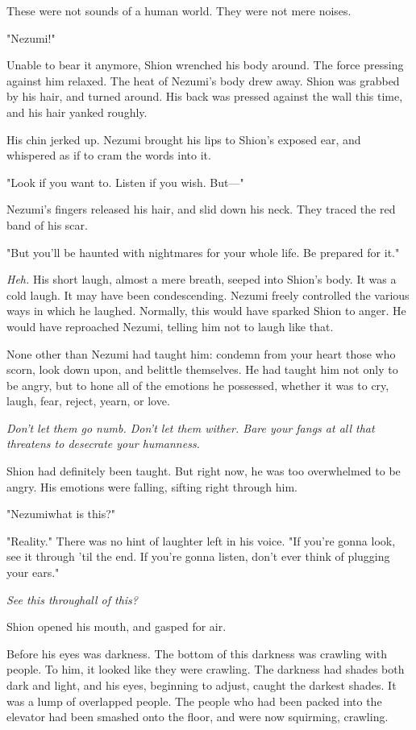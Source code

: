 These were not sounds of a human world. They were not mere noises.

"Nezumi!"

Unable to bear it anymore, Shion wrenched his body around. The force
pressing against him relaxed. The heat of Nezumi's body drew away. Shion
was grabbed by his hair, and turned around. His back was pressed against
the wall this time, and his hair yanked roughly.

His chin jerked up. Nezumi brought his lips to Shion's exposed ear, and
whispered as if to cram the words into it.

"Look if you want to. Listen if you wish. But---"

Nezumi's fingers released his hair, and slid down his neck. They traced
the red band of his scar.

"But you'll be haunted with nightmares for your whole life. Be prepared
for it."

\emph{Heh.} His short laugh, almost a mere breath, seeped into Shion's body. It
was a cold laugh. It may have been condescending. Nezumi freely
controlled the various ways in which he laughed. Normally, this would
have sparked Shion to anger. He would have reproached Nezumi, telling
him not to laugh like that.

None other than Nezumi had taught him: condemn from your heart those who
scorn, look down upon, and belittle themselves. He had taught him not
only to be angry, but to hone all of the emotions he possessed, whether
it was to cry, laugh, fear, reject, yearn, or love.

\emph{Don't let them go numb. Don't let them wither. Bare your fangs at all
that threatens to desecrate your humanness.}

Shion had definitely been taught. But right now, he was too overwhelmed
to be angry. His emotions were falling, sifting right through him.

"Nezumi\el what is this?"

"Reality." There was no hint of laughter left in his voice. "If you're
gonna look, see it through 'til the end. If you're gonna listen, don't
ever think of plugging your ears."

\emph{See this through\el all of this?}

Shion opened his mouth, and gasped for air.

Before his eyes was darkness. The bottom of this darkness was crawling
with people. To him, it looked like they were crawling. The darkness had
shades both dark and light, and his eyes, beginning to adjust, caught
the darkest shades. It was a lump of overlapped people. The people who
had been packed into the elevator had been smashed onto the floor, and
were now squirming, crawling.

